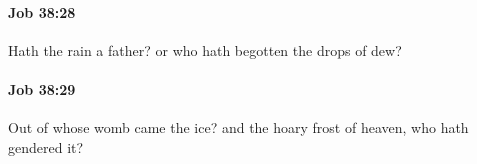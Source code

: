 		\paragraph{Job 38:28} %
			\label{JOB-38-28}

			Hath the rain a father? or who hath begotten the drops of dew?


		\paragraph{Job 38:29} %
			\label{JOB-38-29}

			Out of whose womb came the ice? and the hoary frost of heaven, who hath gendered it?


